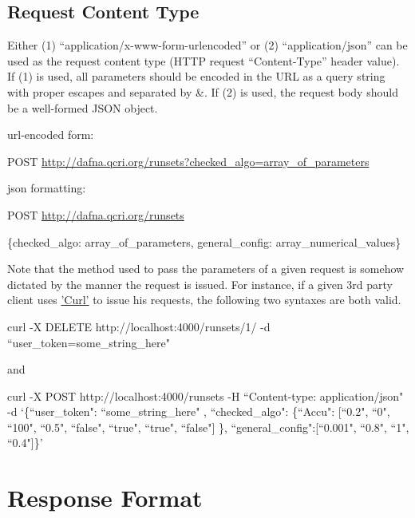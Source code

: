 \documentclass[a4paper,10pt]{scrartcl}
\begin{document}
\subsection{Request Content Type}
Either (1) ``application/x-www-form-urlencoded” or (2) ``application/json” can be used as the request content type (HTTP request “Content-Type” header value). 
If (1) is used, all parameters should be encoded in the URL as a query string with proper escapes and separated by \&. If (2) is used, the request body should 
be a well-formed JSON object. 

\begin{description}
 \item url-encoded form:
 \item POST \href{http://localhost:4000/runsets?checked\_algo=array\_of\_parameters}{http://dafna.qcri.org/runsets?checked\_algo=array\_of\_parameters}
 \item json formatting:
 \item POST \href{http://localhost:4000/runsets}{http://dafna.qcri.org/runsets}
 \item \{checked\_algo: array\_of\_parameters, general\_config: array\_numerical\_values\}
\end{description}


Note that the method used to pass the parameters of a given request is somehow dictated by the manner the request is issued.
For instance, if a given 3rd party client uses
\href{http://curl.haxx.se/}{'Curl'} to issue his requests, the following two syntaxes are both valid.
\begin{description}
 \item curl -X DELETE http://localhost:4000/runsets/1/ -d ``user\_token=some\_string\_here"\\
 \item and \\
 \item curl -X POST http://localhost:4000/runsets -H ``Content-type: application/json" -d `\{``user\_token": ``some\_string\_here" , ``checked\_algo": \{``Accu": [``0.2", ``0", ``100", ``0.5", ``false", ``true", ``true", ``false"] \}, ``general\_config":[``0.001", ``0.8", ``1", ``0.4"]\}' 
\end{description}
\section{Response Format}
\end{document}
